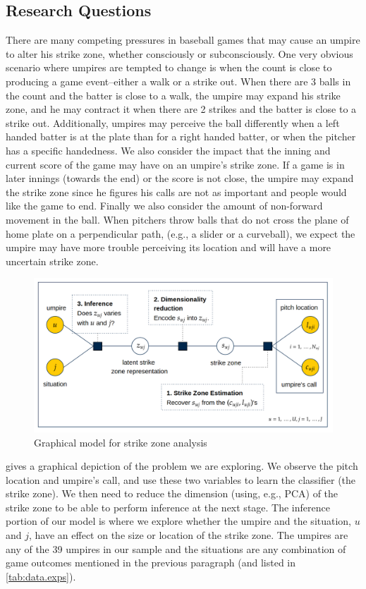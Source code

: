 \documentclass[letterpaper,12pt]{article}
\begin{document}
\subsection{Research Questions}\label{sec:motivation}
There are many competing pressures in baseball games that may cause an umpire to alter his strike zone, whether consciously or subconsciously. 
One very obvious scenario where umpires are tempted to change is when the count is close to producing a game event--either a walk or a strike out. 
When there are 3 balls in the count and the batter is close to a walk, the umpire may expand his strike zone, and he may contract it when there are 2 strikes and the batter is close to a strike out.
Additionally, umpires may perceive the ball differently when a left handed batter is at the plate than for a right handed batter, or when the pitcher has a specific handedness.
We also consider the impact that the inning and current score of the game may have on an umpire's strike zone. 
If a game is in later innings (towards the end) or the score is not close, the umpire may expand the strike zone since he figures his calls are not as important and people would like the game to end.
Finally we also consider the amount of non-forward movement in the ball. 
When pitchers throw balls that do not cross the plane of home plate on a perpendicular path, (e.g., a slider or a curveball), we expect the umpire may have more trouble perceiving its location and will have a more uncertain strike zone. 

\begin{figure}[]
    \centering
    \includegraphics[scale=0.25]{fig/model_3.png}
    \caption{Graphical model for strike zone analysis}
    \label{fig:model_3}
\end{figure}



 gives a graphical depiction of the problem we are exploring. 
We observe the pitch location and umpire's call, and use these two variables to learn the classifier (the strike zone).
We then need to reduce the dimension (using, e.g., PCA) of the strike zone to be able to perform inference at the next stage.
The inference portion of our model is where we explore whether the umpire and the situation, $u$ and $j$, have an effect on the size or location of the strike zone. 
The umpires are any of the 39 umpires in our sample and the situations are any combination of game outcomes mentioned in the previous paragraph (and listed in \cref{tab:data.exps}). 
\end{document}
